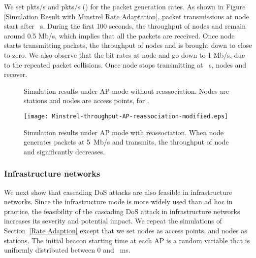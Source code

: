 \documentclass{IEEEtran}
\begin{document}
We set  pkts/s and
 pkts/s () for the packet generation rates. As shown in Figure \ref{Simulation Result with Minstrel Rate Adaptation},
packet transmissions at
node  start after ~s.
During the first 100 seconds, the throughput of nodes  and
 remain around 0.5 Mb/s, which implies that all the packets are
received.
Once node  starts transmitting packets,
the throughput of nodes  and  is brought down to close
to zero. We also observe that the bit rates at node  and  go down to 1 Mb/s,
due to the repeated packet collisions. Once node
 stops transmitting at ~s, nodes  and  recover.








\begin{figure}[!t]
\centering
{}
\vfil
{}
\caption{Simulation results under AP mode without reassociation. Nodes  are stations and
  nodes  are access points, for .}
\label{Simulation Result under AP}
\end{figure}

\begin{figure}[!t]
\centering
\texttt{[image: Minstrel-throughput-AP-reassociation-modified.eps]}
\caption{Simulation results under AP mode with reassociation. When
  node  generates packets at 5~Mb/s and transmits, the throughput of node  and  significantly decreases.}
\label{Simulation Result under AP mode with reassociation}
\end{figure}


\subsubsection{Infrastructure networks}
We next show that cascading DoS attacks are also feasible in
infrastructure networks. Since the infrastructure mode is more
widely used than ad hoc in practice, the feasibility of the cascading
DoS attack in infrastructure networks increases its severity and
potential impact. We repeat the simulations of Section~\ref{Rate
  Adaption} except that we set nodes  as access points, and
nodes  as stations. The initial beacon starting time at each AP is a random variable that is uniformly distributed between 0 and ~ms.
\end{document}
